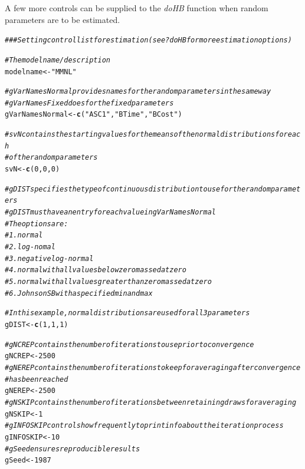 \documentclass{article}\usepackage[]{graphicx}\usepackage[]{color}
\makeatletter
\newcommand{\hlnum}[1]{\textcolor[rgb]{0.686,0.059,0.569}{#1}}%
\newcommand{\hlstr}[1]{\textcolor[rgb]{0.192,0.494,0.8}{#1}}%
\newcommand{\hlcom}[1]{\textcolor[rgb]{0.678,0.584,0.686}{\textit{#1}}}%
\newcommand{\hlstd}[1]{\textcolor[rgb]{0.345,0.345,0.345}{#1}}%
\newcommand{\hlkwb}[1]{\textcolor[rgb]{0.69,0.353,0.396}{#1}}%
\newcommand{\hlkwd}[1]{\textcolor[rgb]{0.737,0.353,0.396}{\textbf{#1}}}%
\newenvironment{kframe}{%
 \def\at@end@of@kframe{}%
 \ifinner\ifhmode%
  \def\at@end@of@kframe{\end{minipage}}%
  \begin{minipage}{\columnwidth}%
 \fi\fi%
 \def\FrameCommand##1{\hskip\@totalleftmargin \hskip-\fboxsep
 \colorbox{shadecolor}{##1}\hskip-\fboxsep
     \hskip-\linewidth \hskip-\@totalleftmargin \hskip\columnwidth}%
 \MakeFramed {\advance\hsize-\width
   \@totalleftmargin\z@ \linewidth\hsize
   \@setminipage}}%
 {\par\unskip\endMakeFramed%
 \at@end@of@kframe}
\newenvironment{knitrout}{}{} %
\makeatother
\begin{document}
A few more controls can be supplied to the \emph{doHB} function when random parameters are to be estimated.

\begin{knitrout}
\color{fgcolor}\begin{kframe}
\begin{alltt}
\hlcom{### Setting control list for estimation (see ?doHB for more estimation options)}

\hlcom{# The model name/description}
\hlstd{modelname} \hlkwb{<-} \hlstr{"MMNL"}

\hlcom{# gVarNamesNormal provides names for the random parameters in the same way}
\hlcom{# gVarNamesFixed does for the fixed parameters}
\hlstd{gVarNamesNormal} \hlkwb{<-} \hlkwd{c}\hlstd{(}\hlstr{"ASC1"}\hlstd{,}\hlstr{"BTime"}\hlstd{,}\hlstr{"BCost"}\hlstd{)}

\hlcom{# svN contains the starting values for the means of the normal distributions for each }
\hlcom{# of the random parameters}
\hlstd{svN} \hlkwb{<-} \hlkwd{c}\hlstd{(}\hlnum{0}\hlstd{,} \hlnum{0}\hlstd{,} \hlnum{0}\hlstd{)}

\hlcom{# gDIST specifies the type of continuous distribution to use for the random parameters}
\hlcom{# gDIST must have an entry for each value in gVarNamesNormal}
\hlcom{# The options are:}
\hlcom{# 1. normal}
\hlcom{# 2. log-nomal}
\hlcom{# 3. negative log-normal}
\hlcom{# 4. normal with all values below zero massed at zero}
\hlcom{# 5. normal with all values greater than zero massed at zero}
\hlcom{# 6. Johnson SB with a specified min and max}

\hlcom{# In this example, normal distributions are used for all 3 parameters}
\hlstd{gDIST} \hlkwb{<-} \hlkwd{c}\hlstd{(}\hlnum{1}\hlstd{,} \hlnum{1}\hlstd{,} \hlnum{1}\hlstd{)}

\hlcom{# gNCREP contains the number of iterations to use prior to convergence}
\hlstd{gNCREP} \hlkwb{<-} \hlnum{2500}
\hlcom{# gNEREP contains the number of iterations to keep for averaging after convergence }
\hlcom{# has been reached}
\hlstd{gNEREP} \hlkwb{<-} \hlnum{2500}
\hlcom{# gNSKIP contains the number of iterations between retaining draws for averaging}
\hlstd{gNSKIP} \hlkwb{<-} \hlnum{1}
\hlcom{# gINFOSKIP controls how frequently to print info about the iteration process}
\hlstd{gINFOSKIP} \hlkwb{<-} \hlnum{10}
\hlcom{# gSeed ensures reproducible results}
\hlstd{gSeed} \hlkwb{<-} \hlnum{1987}


\end{alltt}
\end{kframe}
\end{knitrout}
\end{document}
